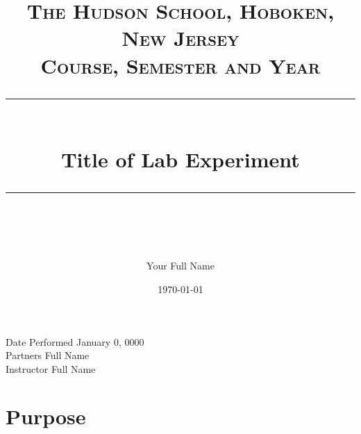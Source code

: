 \documentclass{article} %
\title{
\normalfont \normalsize 
\textsc{The Hudson School, Hoboken, New Jersey \\ 
Course, Semester and Year} \\
[10pt] 
\rule{\linewidth}{0.5pt} \\[6pt] 
\huge Title of Lab Experiment \\
\rule{\linewidth}{2pt}  \\[10pt]
}
\author{Your Full Name}
\date{\normalsize \today}
\begin{document}
\maketitle
\noindent
Date Performed \dotfill January 0, 0000 \\
Partners \dotfill Full Name \\
Instructor \dotfill Full Name \\



%
%
%
%





\section{Purpose}









\end{document}
